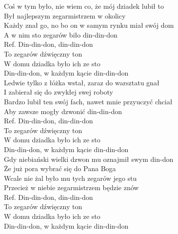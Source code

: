 
\begin{flushleft}
Coś w tym było, nie wiem co, że mój dziadek lubił to \\
Był najlepszym zegarmistrzem w okolicy \tab{}\\
Każdy znał go, no bo on w samym rynku miał swój dom \\
A w nim sto zegarów biło din-din-don \tab{}\\
\vskip 3mm
Ref. Din-din-don, din-din-don \tab{}\tab{}\\
\hspace{0.9cm}To zegarów dźwięczny ton \tab{}\\
\hspace{0.9cm}W domu dziadka było ich ze sto \tab{}\\
\hspace{0.9cm}Din-din-don, w każdym kącie din-din-don \\
\vskip 3mm
Ledwie tylko z łóżka wstał, zaraz do warsztatu gnał \\
I zabierał się do zwykłej swej roboty \\
Bardzo lubił ten swój fach, nawet mnie przyuczyć chciał \\
Aby zawsze mogły dzwonić din-din-don \\
\vskip 3mm
Ref. Din-din-don, din-din-don \\
\hspace{0.9cm}To zegarów dźwięczny ton \\
\hspace{0.9cm}W domu dziadka było ich ze sto \\
\hspace{0.9cm}Din-din-don, w każdym kącie din-din-don \\
\vskip 3mm
Gdy niebiański wielki dzwon mu oznajmił swym din-don \\
Że już pora wybrać się do Pana Boga \\
Wcale nie żal było mu tych zegarów jego stu \\
Przecież w niebie zegarmistrzem będzie znów \\
\vskip 3mm
Ref. Din-din-don, din-din-don \\
\hspace{0.9cm}To zegarów dźwięczny ton \\
\hspace{0.9cm}W domu dziadka było ich ze sto \\
\hspace{0.9cm}Din-din-don, w każdym kącie din-din-don \\
\end{flushleft}
\clearpage

